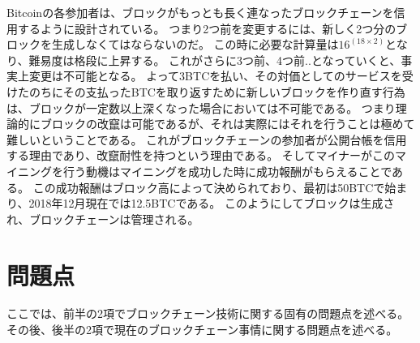 Bitcoinの各参加者は、ブロックがもっとも長く連なったブロックチェーンを信用するように設計されている。
つまり2つ前を変更するには、新しく2つ分のブロックを生成しなくてはならないのだ。
この時に必要な計算量は\(16^(18\times2) \)となり、難易度は格段に上昇する。
これがさらに3つ前、4つ前..となっていくと、事実上変更は不可能となる。
よって3BTCを払い、その対価としてのサービスを受けたのちにその支払ったBTCを取り返すために新しいブロックを作り直す行為は、ブロックが一定数以上深くなった場合においては不可能である。
つまり理論的にブロックの改竄は可能であるが、それは実際にはそれを行うことは極めて難しいということである。
これがブロックチェーンの参加者が公開台帳を信用する理由であり、改竄耐性を持つという理由である。
そしてマイナーがこのマイニングを行う動機はマイニングを成功した時に成功報酬がもらえることである。
この成功報酬はブロック高によって決められており、最初は50BTCで始まり、2018年12月現在では12.5BTCである。
このようにしてブロックは生成され、ブロックチェーンは管理される。

\section{問題点}
ここでは、前半の2項でブロックチェーン技術に関する固有の問題点を述べる。
その後、後半の2項で現在のブロックチェーン事情に関する問題点を述べる。

